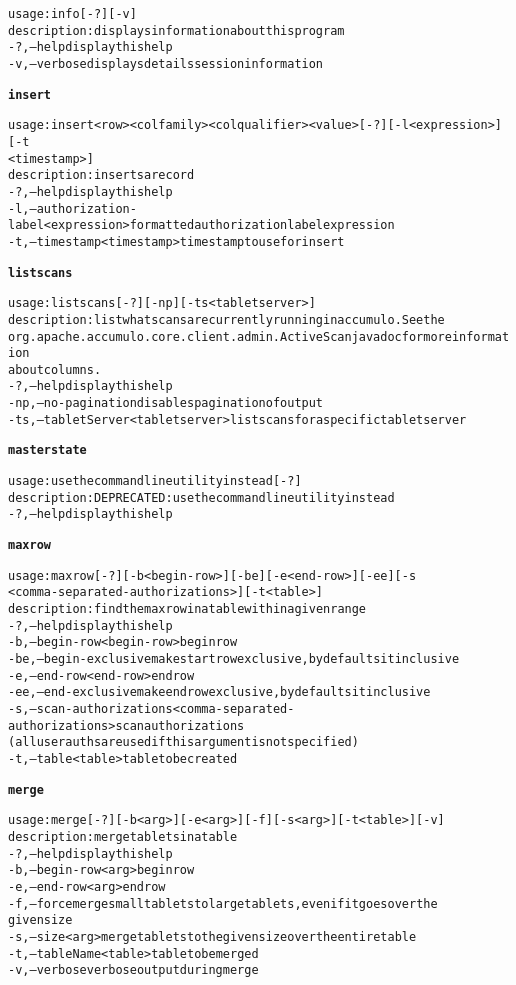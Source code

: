 \begin{alltt}
    usage: info [-?] [-v]
    description: displays information about this program
      -?,--help  display this help
      -v,--verbose	displays details session information

\textbf{insert}

    usage: insert <row> <colfamily> <colqualifier> <value> [-?] [-l <expression>] [-t
    	      <timestamp>]
    description: inserts a record
      -?,--help  display this help
      -l,--authorization-label <expression>  formatted authorization label expression
      -t,--timestamp <timestamp>  timestamp to use for insert

\textbf{listscans}

    usage: listscans [-?] [-np] [-ts <tablet server>]
    description: list what scans are currently running in accumulo. See the
    	      org.apache.accumulo.core.client.admin.ActiveScan javadoc for more information
    	      about columns.
      -?,--help  display this help
      -np,--no-pagination  disables pagination of output
      -ts,--tabletServer <tablet server>  list scans for a specific tablet server

\textbf{masterstate}

    usage: use the command line utility instead [-?]
    description: DEPRECATED: use the command line utility instead
      -?,--help  display this help

\textbf{maxrow}

    usage: maxrow [-?] [-b <begin-row>] [-be] [-e <end-row>] [-ee] [-s
    	      <comma-separated-authorizations>] [-t <table>]
    description: find the max row in a table within a given range
      -?,--help  display this help
      -b,--begin-row <begin-row>  begin row
      -be,--begin-exclusive  make start row exclusive, by defaults it inclusive
      -e,--end-row <end-row>  end row
      -ee,--end-exclusive  make end row exclusive, by defaults it inclusive
      -s,--scan-authorizations <comma-separated-authorizations>  scan authorizations
    	      (all user auths are used if this argument is not specified)
      -t,--table <table>  table to be created

\textbf{merge}

    usage: merge [-?] [-b <arg>] [-e <arg>] [-f] [-s <arg>] [-t <table>] [-v]
    description: merge tablets in a table
      -?,--help  display this help
      -b,--begin-row <arg>	begin row
      -e,--end-row <arg>  end row
      -f,--force  merge small tablets to large tablets, even if it goes over the
    	      given size
      -s,--size <arg>  merge tablets to the given size over the entire table
      -t,--tableName <table>  table to be merged
      -v,--verbose	verbose output during merge


\end{alltt}
